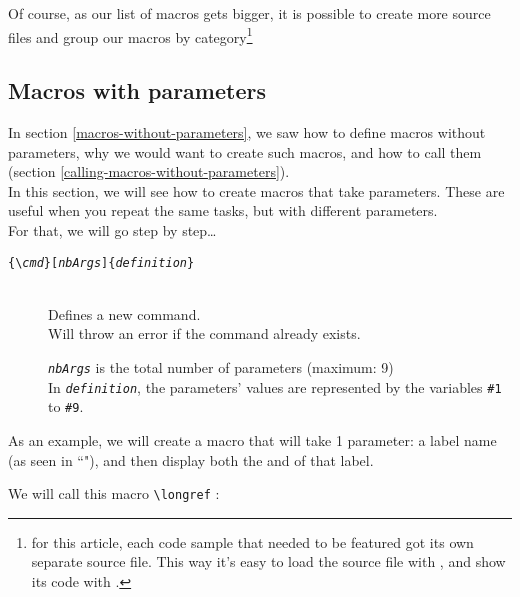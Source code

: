 Of course, as our list of macros gets bigger, it is possible to create more source files and group our macros by category\footnote{for this article, each code sample that needed to be featured got its own separate source file. This way it's easy to load the source file with , and show its code with .} \\



\subsection{Macros with parameters}  \label{macros-with-parameters}

In section \ref{macros-without-parameters}, we saw how to define macros without parameters, why we would want to create such macros, and how to call them (section \ref{calling-macros-without-parameters}). \\

In this section, we will see how to create macros that take parameters. These are useful when you repeat the same tasks, but with different parameters. \\

For that, we will go step by step\dots \\


\begin{description}
	\item[\texttt{\{\textbackslash \emph{cmd}\}[\emph{nbArgs}]\{\emph{definition}\}}] \mbox{} \\
	Defines a new command. \\
	Will throw an error if the command already exists.
	
	\texttt{\emph{nbArgs}} is the total number of parameters (maximum: 9) \\
	In \texttt{\emph{definition}}, the parameters' values are represented by the variables \texttt{\#1} to \texttt{\#9}.
	
\end{description}


\bigskip


As an example, we will create a macro that will take 1 parameter: a label name (as seen in ``"), and then display both the  and  of that label.

We will call this macro \texttt{\textbackslash longref} :



